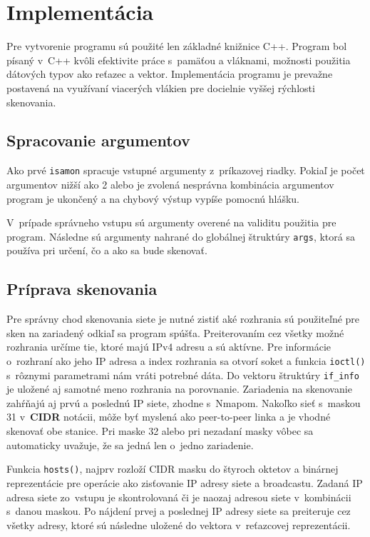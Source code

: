\chapter{Implementácia}
Pre vytvorenie programu sú použité len základné knižnice C++. Program bol písaný v~C++ kvôli efektivite práce s~pamäťou a vláknami, možnosti použitia dátových typov ako reťazec a vektor. Implementácia programu je prevažne postavená na využívaní viacerých vlákien pre docielnie vyššej rýchlosti skenovania.

\section{Spracovanie argumentov}
Ako prvé \texttt{isamon} spracuje vstupné argumenty z~príkazovej riadky. Pokiaľ je počet argumentov nižší ako 2 alebo je zvolená nesprávna kombinácia argumentov program je ukončený a na chybový výstup vypíše pomocnú hlášku. 

V~prípade správneho vstupu sú argumenty overené na validitu použitia pre program. Následne sú argumenty nahrané do globálnej štruktúry \texttt{args}, ktorá sa používa pri určení, čo a ako sa bude skenovať.

\section{Príprava skenovania}
Pre správny chod skenovania siete je nutné zistiť aké rozhrania sú použiteľné pre sken na zariadený odkiaľ sa program spúšťa. Preiterovaním cez všetky možné rozhrania určíme tie, ktoré majú IPv4 adresu a sú aktívne. Pre informácie o~rozhraní ako jeho IP adresa a index rozhrania sa otvorí soket a funkcia \texttt{ioctl()} s~rôznymi parametrami nám vráti potrebné dáta. Do vektoru štruktúry \texttt{if\_info} je uložené aj samotné meno rozhrania na porovnanie. Zariadenia na skenovanie zahŕňajú aj prvú a poslednú IP siete, zhodne s~Nmapom. Nakoľko sieť s~maskou 31 v~\textbf{CIDR} notácii, môže byť myslená ako peer-to-peer linka\cite{peer}  a je vhodné skenovať obe stanice. Pri maske 32 alebo pri nezadaní masky vôbec sa automaticky uvažuje, že sa jedná len o~jedno zariadenie.

Funkcia \texttt{hosts()}, najprv rozloží CIDR masku do štyroch oktetov a binárnej reprezentácie pre operácie ako zisťovanie IP adresy siete a broadcastu. Zadaná IP adresa siete zo~vstupu je skontrolovaná či je naozaj adresou siete v~kombinácii s~danou maskou. Po nájdení prvej a poslednej IP adresy siete sa preiteruje cez všetky adresy, ktoré sú následne uložené do vektora v~reťazcovej reprezentácii.

